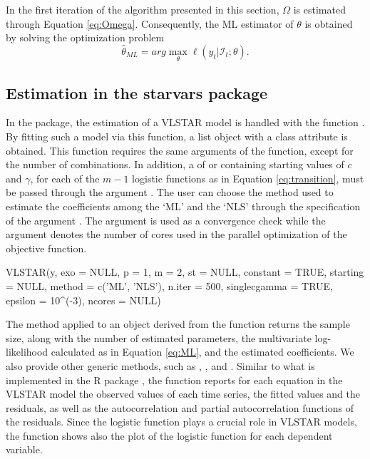 In the first iteration of the algorithm presented in this section, $\Omega$ is estimated through Equation \eqref{eq:Omega}. Consequently, the ML estimator of $\theta$ is obtained by solving the optimization problem
\begin{equation}
\hat{\theta}_{ML} = arg \max_{\theta}\ell\left(y_t|\mathcal{I}_t;\theta\right).
\end{equation}


\subsection{Estimation in the starvars package} \label{estimationR}



In the  package, the estimation of a VLSTAR model is handled with the function . By fitting such a model via this function, a list object with a class attribute  is obtained. This function requires the same arguments of the  function, except for the number of combinations. In addition, a  of  or  containing starting values of $c$ and $\gamma$, for each of the $m-1$ logistic functions as in Equation \eqref{eq:transition}, must be passed through the argument . The user can choose the method used to estimate the coefficients among the `ML' and the `NLS' through the specification of the argument . The argument  is used as a convergence check while the argument  denotes the number of cores used in the parallel optimization of the objective function.

%
\begin{example}
	VLSTAR(y, exo = NULL, p = 1, m = 2, st = NULL, constant = TRUE,
	starting = NULL,
	method = c('ML', 'NLS'), 
	n.iter = 500, singlecgamma = TRUE, 
	epsilon = 10^(-3), ncores = NULL)
\end{example}
%


The  method applied to an object derived from the  function returns the sample size, along with the number of estimated parameters, the multivariate log-likelihood calculated as in Equation \eqref{eq:ML},
and the estimated coefficients. We also provide other generic methods, such as , ,  and . Similar to what is implemented in the R package , the  function reports for each equation in the VLSTAR model the observed values of each time series, the fitted values and the residuals, as well as the autocorrelation and partial autocorrelation functions of the residuals. Since the logistic function plays a crucial role in VLSTAR models, the  function shows also the plot of the logistic function for each dependent variable. 


